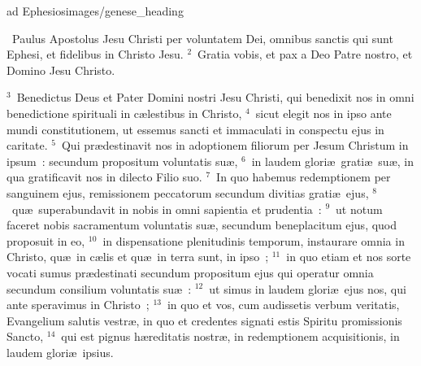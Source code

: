 {ad Ephesios}{images/genese_heading}

~\lettrine[lines=10,image=true,loversize=0.05,lraise=-0.03]{P}{}aulus Apostolus Jesu Christi per voluntatem Dei, omnibus sanctis qui sunt Ephesi, et fidelibus in Christo Jesu.
${}^{2}$~Gratia vobis, et pax a Deo Patre nostro, et Domino Jesu Christo.


${}^{3}$~Benedictus Deus et Pater Domini nostri Jesu Christi, qui benedixit nos in omni benedictione spirituali in c\ae lestibus in Christo,
${}^{4}$~sicut elegit nos in ipso ante mundi constitutionem, ut essemus sancti et immaculati in conspectu ejus in caritate.
${}^{5}$~Qui pr\ae destinavit nos in adoptionem filiorum per Jesum Christum in ipsum~: secundum propositum voluntatis su\ae ,
${}^{6}$~in laudem glori\ae\ grati\ae\ su\ae , in qua gratificavit nos in dilecto Filio suo.
${}^{7}$~In quo habemus redemptionem per sanguinem ejus, remissionem peccatorum secundum divitias grati\ae\ ejus,
${}^{8}$~qu\ae\ superabundavit in nobis in omni sapientia et prudentia~:
${}^{9}$~ut notum faceret nobis sacramentum voluntatis su\ae , secundum beneplacitum ejus, quod proposuit in eo,
${}^{10}$~in dispensatione plenitudinis temporum, instaurare omnia in Christo, qu\ae\ in c\ae lis et qu\ae\ in terra sunt, in ipso~;
${}^{11}$~in quo etiam et nos sorte vocati sumus pr\ae destinati secundum propositum ejus qui operatur omnia secundum consilium voluntatis su\ae~:
${}^{12}$~ut simus in laudem glori\ae\ ejus nos, qui ante speravimus in Christo~;
${}^{13}$~in quo et vos, cum audissetis verbum veritatis, Evangelium salutis vestr\ae , in quo et credentes signati estis Spiritu promissionis Sancto,
${}^{14}$~qui est pignus h\ae reditatis nostr\ae , in redemptionem acquisitionis, in laudem glori\ae\ ipsius.


